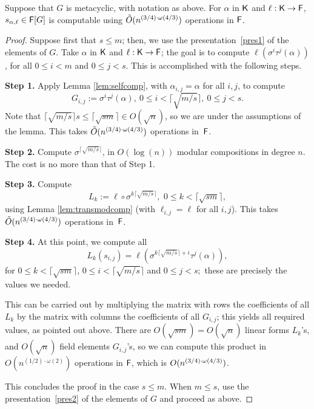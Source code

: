\begin{proposition}\label{prop:sum_meta}
  Suppose that $G$ is metacyclic, with notation as above. For $\alpha$
  in ${\mathsf{K}}$ and $\ell:{\mathsf{K}}\to{\mathsf{F}}$, $s_{\alpha,\ell} \in {\mathsf{F}}[G]$ is
  computable using $\tilde{O}(n^{(3/4)\cdot \omega(4/3)})$ operations in ${\mathsf{F}}$.
\end{proposition}
\begin{proof}
  Suppose first that $s \le m$; then, we use the
  presentation~\eqref{pres1} of the elements of $G$. Take $\alpha$ in
  ${\mathsf{K}}$ and $\ell:{\mathsf{K}} \to {\mathsf{F}}$; the goal is to compute
  $\ell(\sigma^i\tau^j (\alpha))$, for all $0\leq i < m$ and $0 \leq j
  <s.$ This is accomplished with the following steps.

\smallskip\noindent\textbf{Step 1.} Apply Lemma \ref{lem:selfcomp},
with $\alpha_{i,j}=\alpha$ for all $i,j$, to compute
$$G_{i,j} := \sigma^i\tau^j(\alpha),\ 0\leq i < \lceil \sqrt{m/s}
\rceil,\ 0 \leq j < s.$$ Note that
$\lceil \sqrt{m/s} \rceil s \leq \lceil \sqrt{sm} \rceil \in O(\sqrt n)$,
so we are under the assumptions of the lemma. This takes $\tilde{O}(n^{(3/4)\cdot \omega(4/3)})$
operations in~${\mathsf{F}}$.

\smallskip\noindent\textbf{Step 2.} Compute
$\sigma^{\lceil \sqrt{m/s} \rceil}$, in $O(\log(n))$ modular compositions
in degree $n$. The cost is no more than that of Step 1.

\smallskip\noindent\textbf{Step 3.} Compute
\[
  L_k := \ell \circ \sigma^{k\lceil \sqrt{m/s} \rceil}, \,\, 0\leq k <
  \lceil \sqrt{sm}\rceil,
\]
using Lemma \ref{lem:transmodcomp} (with $\ell_{i,j}=\ell$ for all
$i,j$).  This takes $\tilde{O}(n^{(3/4)\cdot \omega(4/3)})$ operations in~${\mathsf{F}}$.

\smallskip\noindent\textbf{Step 4.} At this point, we compute all
$$ L_k(s_{i,j}) = \ell(\sigma^{k\lceil \sqrt{m/s} \rceil + i}\tau
^j(\alpha)),$$ for $0\le k < \lceil \sqrt{sm}\rceil$,
$0\le i< \lceil \sqrt{m/s}\rceil$ and $0 \leq j < s;$ these are precisely
the values we needed.

This can be carried out by multiplying the matrix with rows the
coefficients of all $L_k$ by the matrix with columns the coefficients of
all $G_{i,j}$; this yields all required values, as pointed out above. There
are $O(\sqrt{sm})=O(\sqrt{n})$ linear forms $L_k$'s, and $O(\sqrt{n})$
field elements $G_{i,j}$'s, so we can compute this product in
$O(n^{(1/2)\cdot\omega(2)})$ operations in ${\mathsf{F}}$, which is $O(n^{(3/4)\cdot \omega(4/3)})$.

This concludes the proof in the case $s \le m$. When $m \le s$, use the
presentation~\eqref{pres2} of the elements of $G$ and proceed as above.
\end{proof}


